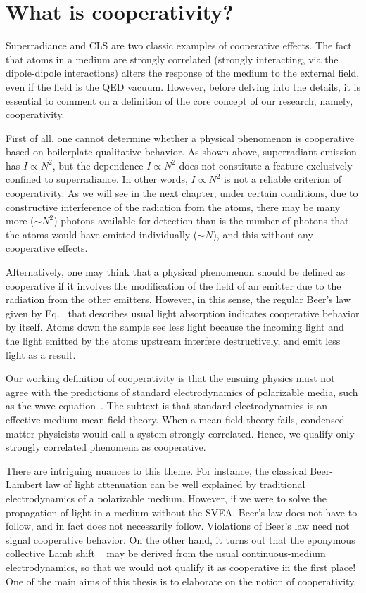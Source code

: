 \section{What is cooperativity?}

Superradiance and CLS are two classic examples of cooperative effects. The fact that atoms in a medium are strongly correlated (strongly interacting, via the dipole-dipole interactions) alters the response of the medium to the external field, even if the field is the QED vacuum. However, before delving into the details, it is essential to comment on a definition of the core concept of our research, namely, cooperativity.

First of all, one cannot determine whether a physical phenomenon is cooperative based on boilerplate qualitative behavior. As shown above, superradiant emission has $I\propto N^2$, but the dependence $I\propto N^2$ does not constitute a feature exclusively confined to superradiance. In other words, $I\propto N^2$ is not a reliable criterion of cooperativity. As we will see in the next chapter, under certain conditions, due to constructive interference of the radiation from the atoms, there may be many more ($\sim N^2$) photons available for detection than is the number of photons that the atoms would have emitted individually ($\sim N$), and this without any cooperative effects.
 

Alternatively, one may think that a physical phenomenon should be defined as cooperative if it involves the modification of the field of an emitter due to the radiation from the other emitters. However, in this sense, the regular Beer's law given by Eq.~ that describes usual light absorption indicates cooperative behavior by itself. Atoms down the sample see less light because the incoming light and the light emitted by the atoms upstream interfere destructively, and emit less light as a result.

Our working definition of cooperativity is that the ensuing physics must not agree with the predictions of standard electrodynamics of polarizable media, such as the wave equation~.  The subtext is that standard electrodynamics is an effective-medium mean-field theory. When a mean-field theory fails, condensed-matter physicists would call a system strongly correlated. Hence, we qualify only strongly correlated phenomena as cooperative.

There are intriguing nuances to this theme. For instance, the classical Beer-Lambert law of light attenuation can be well explained by traditional electrodynamics of a polarizable medium. However, if we were to solve the propagation of light in a medium without the SVEA, Beer's law does not have to follow, and in fact does not necessarily follow. Violations of Beer's law need not signal cooperative behavior. On the other hand, it turns out that the eponymous collective Lamb shift ~ may be derived from the usual continuous-medium electrodynamics, so that we would not qualify it as cooperative in the first place! One of the main aims of this thesis is to elaborate on the notion of cooperativity.
